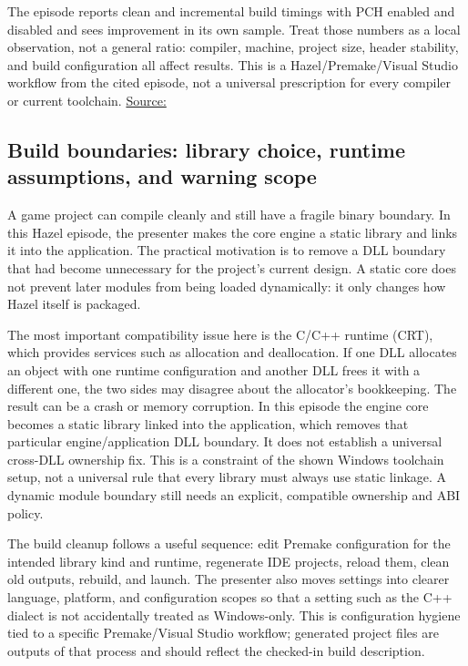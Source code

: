 The episode reports clean and incremental build timings with PCH enabled and disabled and sees improvement in its own sample. Treat those numbers as a local observation, not a general ratio: compiler, machine, project size, header stability, and build configuration all affect results. This is a Hazel/Premake/Visual Studio workflow from the cited episode, not a universal prescription for every compiler or current toolchain. \href{https://www.youtube.com/watch?v=UQ718BrbQ5E}{Source:}

\subsection{Build boundaries: library choice, runtime assumptions, and warning scope}\label{05-engine-i-ch013-build-boundaries-library-choice-runtime-assumptions-and-warning-scope}

A game project can compile cleanly and still have a fragile binary boundary. In this Hazel episode, the presenter makes the core engine a static library and links it into the application. The practical motivation is to remove a DLL boundary that had become unnecessary for the project's current design. A static core does not prevent later modules from being loaded dynamically: it only changes how Hazel itself is packaged.

The most important compatibility issue here is the C/C++ runtime (CRT), which provides services such as allocation and deallocation. If one DLL allocates an object with one runtime configuration and another DLL frees it with a different one, the two sides may disagree about the allocator's bookkeeping. The result can be a crash or memory corruption. In this episode the engine core becomes a static library linked into the application, which removes that particular engine/application DLL boundary. It does not establish a universal cross-DLL ownership fix. This is a constraint of the shown Windows toolchain setup, not a universal rule that every library must always use static linkage. A dynamic module boundary still needs an explicit, compatible ownership and ABI policy.

The build cleanup follows a useful sequence: edit Premake configuration for the intended library kind and runtime, regenerate IDE projects, reload them, clean old outputs, rebuild, and launch. The presenter also moves settings into clearer language, platform, and configuration scopes so that a setting such as the C++ dialect is not accidentally treated as Windows-only. This is configuration hygiene tied to a specific Premake/Visual Studio workflow; generated project files are outputs of that process and should reflect the checked-in build description.

